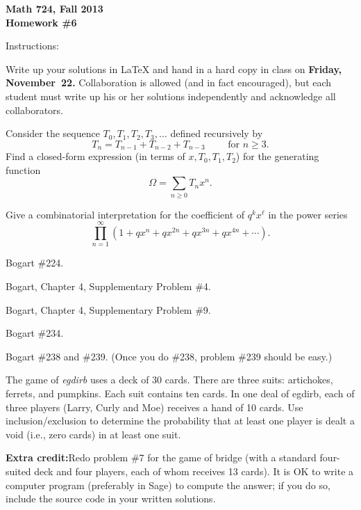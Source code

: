


{\bf Math 724, Fall 2013\\
Homework \#6

Instructions:} Write up your solutions in LaTeX and hand in a hard copy in class on {\bf Friday, November~22.}  Collaboration is allowed (and in fact encouraged), but each student must write up his or her solutions independently and acknowledge all collaborators.

\prob Consider the sequence $T_0,T_1,T_2,T_3,\dots$ defined recursively by
\[T_n = T_{n-1}+T_{n-2}+T_{n-3} \qquad\text{ for } n\geq 3.\]
Find a closed-form expression (in terms of $x,T_0,T_1,T_2$) for the generating function
\[\Omega = \sum_{n\geq0}T_nx^n.\]

\prob
Give a combinatorial interpretation for the coefficient of $q^k x^\ell$ in the power series
\[\prod_{n=1}^\infty (1+qx^n+qx^{2n}+qx^{3n}+qx^{4n}+\cdots).\]

\prob Bogart \#224.

\prob Bogart, Chapter 4, Supplementary Problem \#4.

\prob Bogart, Chapter 4, Supplementary Problem \#9.

\prob Bogart \#234.

\prob Bogart \#238 and \#239.  (Once you do \#238, problem \#239 should be easy.)

\prob The game of \textit{egdirb} uses a deck of 30 cards.  There are three suits: artichokes, ferrets, and pumpkins.  Each suit contains ten cards.  In one deal of egdirb, each of three players (Larry, Curly and Moe) receives a hand of 10 cards.  Use inclusion/exclusion to determine the probability that at least one player is dealt a void (i.e., zero cards) in at least one suit.
\bigskip

{\bf Extra credit:}\quad Redo problem \#7 for the game of bridge (with a standard four-suited deck and four players, each of whom receives 13 cards).  It is OK to write a computer program (preferably in Sage) to compute the answer; if you do so, include the source code in your written solutions.

